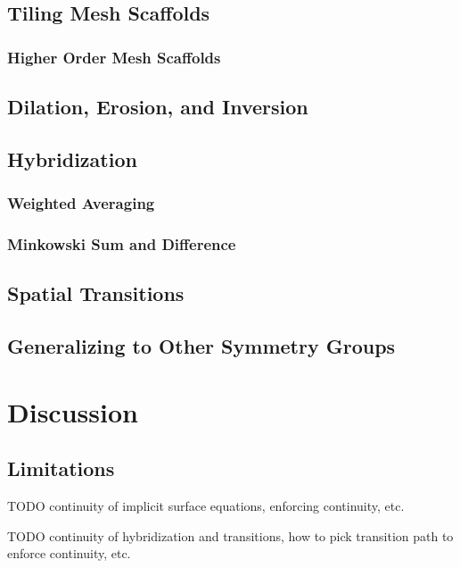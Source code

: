 \documentclass[acmtog]{acmart}
\begin{document}
\subsection{Tiling Mesh Scaffolds}
\label{sec:tiling_mesh_scaffolds}

\subsubsection{Higher Order Mesh Scaffolds}
\label{sec:higher_order_scaffolds}

\subsection{Dilation, Erosion, and Inversion}
\label{sec:dilation_erosion_inversion}

\subsection{Hybridization}

\subsubsection{Weighted Averaging}

\subsubsection{Minkowski Sum and Difference}

\subsection{Spatial Transitions}
\label{sec:spatial_transitions}

\subsection{Generalizing to Other Symmetry Groups}

\section{Discussion}
\subsection{Limitations}
TODO continuity of implicit surface equations, enforcing continuity, etc.

TODO continuity of hybridization and transitions, how to pick transition path to enforce continuity, etc.
\end{document}
